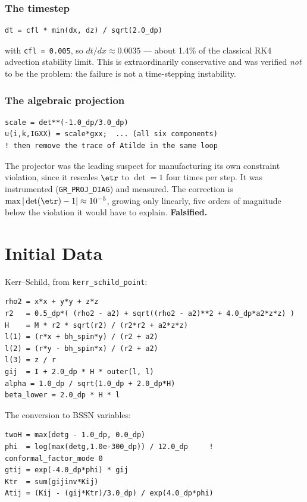 \subsubsection{The timestep}

\begin{lstlisting}
dt = cfl * min(dx, dz) / sqrt(2.0_dp)
\end{lstlisting}
with \texttt{cfl = 0.005}, so $dt/dx \approx 0.0035$ --- about 1.4\% of the
classical RK4 advection stability limit. This is extraordinarily conservative
and was verified \emph{not} to be the problem: the failure is not a
time-stepping instability.

\subsubsection{The algebraic projection}

\begin{lstlisting}
scale = det**(-1.0_dp/3.0_dp)
u(i,k,IGXX) = scale*gxx;  ... (all six components)
! then remove the trace of Atilde in the same loop
\end{lstlisting}

\gotcha
The projector was the leading suspect for manufacturing its own constraint
violation, since it rescales $\etr$ to $\det = 1$ four times per step. It was
instrumented (\texttt{GR\_PROJ\_DIAG}) and measured. The correction is
$\max|\det(\etr) - 1| \approx 10^{-5}$, growing only linearly, five orders of
magnitude below the violation it would have to explain. \textbf{Falsified.}

\section{Initial Data}
\label{ch:id}

Kerr--Schild, from \texttt{kerr\_schild\_point}:
\begin{lstlisting}
rho2 = x*x + y*y + z*z
r2   = 0.5_dp*( (rho2 - a2) + sqrt((rho2 - a2)**2 + 4.0_dp*a2*z*z) )
H    = M * r2 * sqrt(r2) / (r2*r2 + a2*z*z)
l(1) = (r*x + bh_spin*y) / (r2 + a2)
l(2) = (r*y - bh_spin*x) / (r2 + a2)
l(3) = z / r
gij  = I + 2.0_dp * H * outer(l, l)
alpha = 1.0_dp / sqrt(1.0_dp + 2.0_dp*H)
beta_lower = 2.0_dp * H * l
\end{lstlisting}

The conversion to BSSN variables:
\begin{lstlisting}
twoH = max(detg - 1.0_dp, 0.0_dp)
phi  = log(max(detg,1.0e-300_dp)) / 12.0_dp     ! conformal_factor_mode 0
gtij = exp(-4.0_dp*phi) * gij
Ktr  = sum(gijinv*Kij)
Atij = (Kij - (gij*Ktr)/3.0_dp) / exp(4.0_dp*phi)
\end{lstlisting}

